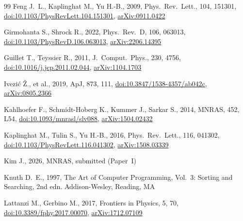 \documentclass[fleqn,usenatbib]{mnras}
\begin{document}
\begin{thebibliography}{99}
Feng J.~L., Kaplinghat M., Yu H.-B., 2009, Phys.\ Rev.\ Lett., 104, 151301,
\href{https://doi.org/10.1103/PhysRevLett.104.151301}{doi:10.1103/PhysRevLett.104.151301},
\href{https://arxiv.org/abs/0911.0422}{arXiv:0911.0422}

Girmohanta S., Shrock R., 2022, Phys.\ Rev.\ D, 106, 063013,
\href{https://doi.org/10.1103/PhysRevD.106.063013}{doi:10.1103/PhysRevD.106.063013},
\href{https://arxiv.org/abs/2206.14395}{arXiv:2206.14395}

Guillet T., Teyssier R., 2011, J.\ Comput.\ Phys., 230, 4756,
\href{https://doi.org/10.1016/j.jcp.2011.02.044}{doi:10.1016/j.jcp.2011.02.044},
\href{https://arxiv.org/abs/1104.1703}{arXiv:1104.1703}

Ivezi{\'c} {\v Z}., et al., 2019, ApJ, 873, 111,
\href{https://doi.org/10.3847/1538-4357/ab042c}{doi:10.3847/1538-4357/ab042c},
\href{https://arxiv.org/abs/0805.2366}{arXiv:0805.2366}

Kahlhoefer F., Schmidt-Hoberg K., Kummer J., Sarkar S., 2014, MNRAS, 452, L54,
\href{https://doi.org/10.1093/mnrasl/slv088}{doi:10.1093/mnrasl/slv088},
\href{https://arxiv.org/abs/1504.02432}{arXiv:1504.02432}

Kaplinghat M., Tulin S., Yu H.-B., 2016, Phys.\ Rev.\ Lett., 116, 041302,
\href{https://doi.org/10.1103/PhysRevLett.116.041302}{doi:10.1103/PhysRevLett.116.041302},
\href{https://arxiv.org/abs/1508.03339}{arXiv:1508.03339}

Kim J., 2026, MNRAS, submitted (Paper~I)

Knuth D.~E., 1997, The Art of Computer Programming, Vol.~3:
Sorting and Searching, 2nd edn. Addison-Wesley, Reading, MA

Lattanzi M., Gerbino M., 2017, Frontiers in Physics, 5, 70,
\href{https://doi.org/10.3389/fphy.2017.00070}{doi:10.3389/fphy.2017.00070},
\href{https://arxiv.org/abs/1712.07109}{arXiv:1712.07109}


\end{thebibliography}
\end{document}
